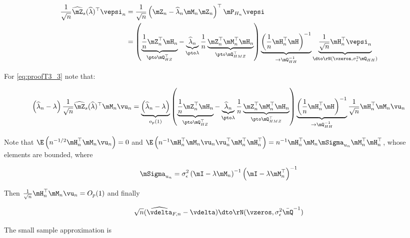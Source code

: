 \documentclass[english,12pt]{book}\usepackage[]{graphicx}\usepackage[]{xcolor}
\begin{document}
\begin{subappendices}
\begin{equation}
\begin{aligned}
   \frac{1}{\sqrt{n}}\widehat{\mZ}_s(\widehat{\lambda})^\top\vepsi_n & = \frac{1}{\sqrt{n}}\left(\mZ_n -\widehat{\lambda}_n\mM_n\mZ_n\right)^\top\mP_{H_n}\vepsi \\
                                                                     & = \left(\underbrace{\frac{1}{n}\mZ_n^\top \mH_n}_{\pto \mQ_{HZ}^\top} - \underbrace{\widehat{\lambda}_n}_{\pto \lambda}\frac{1}{n}\underbrace{\mZ_n^\top\mM_n^\top\mH_n}_{\pto \mQ_{HMZ}^\top}\right)\underbrace{\left(\frac{1}{n}\mH_n^\top\mH\right)^{-1}}_{\to \mQ_{HH}^{-1}}\underbrace{\frac{1}{\sqrt{n}}\mH_n^\top\vepsi_n}_{\dto \rN(\vzeros, \sigma^2_{\epsilon}\mQ_{HH})}
\end{aligned}
\end{equation}

For \ref{eq:proofT3_3} note that:

\begin{equation}
    \left(\widehat{\lambda}_n- \lambda\right)\frac{1}{\sqrt{n}}\widehat{\mZ}_s(\widehat{\lambda})^\top\mM_n\vu_n  = \underbrace{\left(\widehat{\lambda}_n- \lambda\right)}_{o_p(1)}\left(\underbrace{\frac{1}{n}\mZ_n^\top \mH_n}_{\pto \mQ_{HZ}^\top} - \underbrace{\widehat{\lambda}_n}_{\pto \lambda}\frac{1}{n}\underbrace{\mZ_n^\top\mM_n^\top\mH_n}_{\pto \mQ_{HMZ}^\top}\right)\underbrace{\left(\frac{1}{n}\mH_n^\top\mH\right)^{-1}}_{\to \mQ_{HH}^{-1}}\frac{1}{\sqrt{n}}\mH_n^\top\mM_n\vu_n
\end{equation}

Note that $\E\left(n^{-1/2}\mH_n^\top\mM_n\vu_n\right) = 0$ and $\E\left(n^{-1}\mH_n^\top\mM_n\vu_n\vu^\top_n\mM_n^\top\mH^\top_n\right) = n^{-1} \mH_n^\top\mM_n\mSigma_{u_n}\mM_n^\top\mH^\top_n$, whose elements are bounded, where

\begin{equation*}
\mSigma_{u_n} = \sigma^2_{\epsilon}\left(\mI - \lambda\mM_n\right)^{-1}\left(\mI - \lambda\mM_n^\top\right)^{-1}
\end{equation*}

Then $\frac{1}{\sqrt{n}}\mH_n^\top\mM_n\vu_n = O_p(1)$ and finally

\begin{equation}
   \sqrt{n} (\widehat{\vdelta}_{F, n} - \vdelta)\dto \rN(\vzeros, \sigma^2_{\epsilon}\bar{\mQ}^{-1})
\end{equation}

The small sample approximation is


\end{subappendices}
\end{document}
